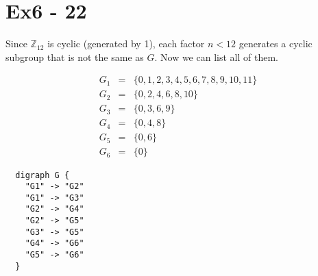 \section*{Ex6 - 22}
Since $ \mathbb{Z}_{12} $ is cyclic (generated by 1), each factor $ n < 12 $ generates a cyclic subgroup that is not the same as $ G $. Now we can list all of them.

\begin{eqnarray*}
  G_1 &=& \{0,1,2,3,4,5,6,7,8,9,10,11\} \\
  G_2 &=& \{0,2,4,6,8,10\} \\
  G_3 &=& \{0,3,6,9\} \\
  G_4 &=& \{0,4,8\} \\
  G_5 &=& \{0,6\} \\
  G_6 &=& \{0\}
\end{eqnarray*}

\begin{verbatim}
  digraph G {
    "G1" -> "G2"
    "G1" -> "G3"
    "G2" -> "G4"
    "G2" -> "G5"
    "G3" -> "G5"
    "G4" -> "G6"
    "G5" -> "G6"
  }  
\end{verbatim}
